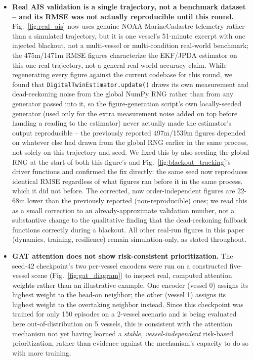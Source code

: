 \documentclass[journal,twocolumn,10pt]{IEEEtran}
\begin{document}
\begin{itemize}
presents training or evaluation conditions under which the twin's filtering would change the policy's behavior (Table~\ref{tab:ablation_table}). Rule-Based COLREGs' advantage over all three RL methods is the one finding from the intermediate version that held up under correctly randomized seeds. We report all of this, including our own error and how we found it, because a paper's statistical claims are only as trustworthy as the seeding infrastructure producing them, and we would rather disclose that infrastructure failed once than have a reader discover it independently.
    \item \textbf{Real AIS validation is a single trajectory, not a benchmark dataset -- and its RMSE was not actually reproducible until this round.} Fig.~\ref{fig:real_ais} now uses genuine NOAA MarineCadastre telemetry rather than a simulated trajectory, but it is one vessel's 51-minute excerpt with one injected blackout, not a multi-vessel or multi-condition real-world benchmark; the 475m/1471m RMSE figures characterize the EKF/JPDA estimator on this one real trajectory, not a general real-world accuracy claim. While regenerating every figure against the current codebase for this round, we found that \texttt{DigitalTwinEstimator.update()} draws its own measurement and dead-reckoning noise from the global NumPy RNG rather than from any generator passed into it, so the figure-generation script's own locally-seeded generator (used only for the extra measurement noise added on top before handing a reading to the estimator) never actually made the estimator's output reproducible -- the previously reported 497m/1539m figures depended on whatever else had drawn from the global RNG earlier in the same process, not solely on this trajectory and seed. We fixed this by also seeding the global RNG at the start of both this figure's and Fig.~\ref{fig:blackout_tracking}'s driver functions and confirmed the fix directly: the same seed now reproduces identical RMSE regardless of what figures ran before it in the same process, which it did not before. The corrected, now order-independent figures are 22-68m lower than the previously reported (non-reproducible) ones; we read this as a small correction to an already-approximate validation number, not a substantive change to the qualitative finding that the dead-reckoning fallback functions correctly during a blackout. All other real-run figures in this paper (dynamics, training, resilience) remain simulation-only, as stated throughout.
    \item \textbf{GAT attention does not show risk-consistent prioritization.} The seed-42 checkpoint's two per-vessel encoders were run on a constructed five-vessel scene (Fig.~\ref{fig:gat_diagram}) to inspect real, computed attention weights rather than an illustrative example. One encoder (vessel 0) assigns its highest weight to the head-on neighbor; the other (vessel 1) assigns its highest weight to the overtaking neighbor instead. Since this checkpoint was trained for only 150 episodes on a 2-vessel scenario and is being evaluated here out-of-distribution on 5 vessels, this is consistent with the attention mechanism not yet having learned a \emph{stable, vessel-independent} risk-based prioritization, rather than evidence against the mechanism's capacity to do so with more training.

\end{itemize}
\end{document}
